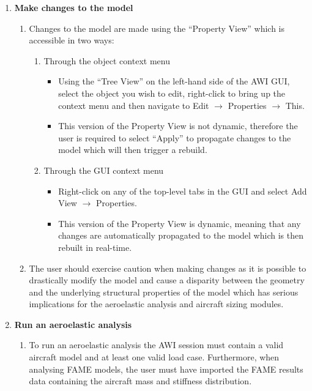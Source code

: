 \begin{enumerate}
\begin{enumerate}
	\end{enumerate}
	\item \textbf{Make changes to the model}
	\begin{enumerate}
		\item Changes to the model are made using the ``Property View'' which is accessible in two ways:
		\begin{enumerate}
			\item Through the object context menu
			\begin{itemize}
				\item Using the ``Tree View'' on the left-hand side of the AWI GUI, select the object you wish to edit, right-click to bring up the context menu and then navigate to Edit $\rightarrow$ Properties $\rightarrow$ This.  
				\item This version of the Property View is not dynamic, therefore the user is required to select ``Apply'' to propagate changes to the model which will then trigger a rebuild.
			\end{itemize}
			\item Through the GUI context menu
			\begin{itemize}
				\item Right-click on any of the top-level tabs in the GUI and select Add View $\rightarrow$ Properties.
				\item This version of the Property View is dynamic, meaning that any changes are automatically propagated to the model which is then rebuilt in real-time. 
			\end{itemize}
		\end{enumerate}
		\item The user should exercise caution when making changes as it is possible to drastically modify the model and cause a disparity between the geometry and the underlying structural properties of the model which has serious implications for the aeroelastic analysis and aircraft sizing modules.
	\end{enumerate}
	\item \textbf{Run an aeroelastic analysis}
	\begin{enumerate}
		\item To run an aeroelastic analysis the AWI session must contain a valid aircraft model and at least one valid load case. Furthermore, when analysing FAME models, the user must have imported the FAME results data containing the aircraft mass and stiffness distribution.

\end{enumerate}
\end{enumerate}
